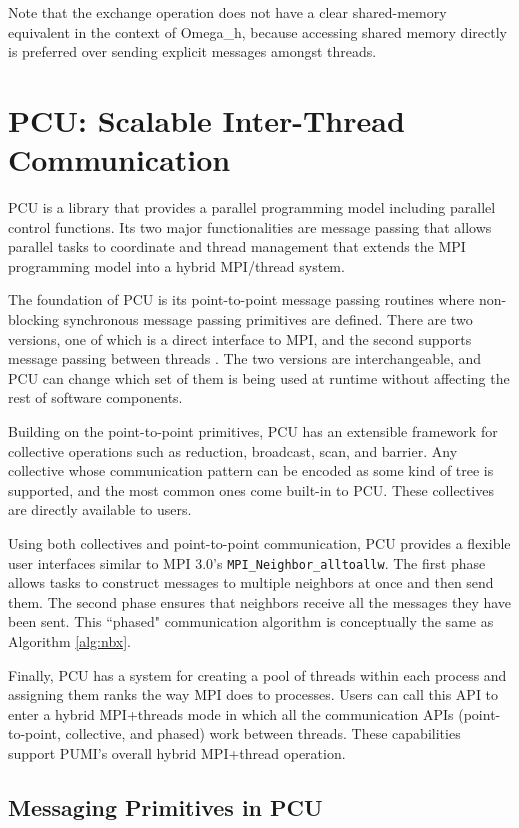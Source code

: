 Note that the exchange operation does not have a clear shared-memory equivalent
in the context of Omega\_h,
because accessing shared memory directly is preferred over sending
explicit messages amongst threads.

\section{PCU: Scalable Inter-Thread Communication}
\label{sec:pcu}

PCU is a library that provides a parallel programming model including
parallel control functions.
Its two major functionalities are message passing that allows parallel tasks to
coordinate and thread management that extends the MPI programming model
into a hybrid MPI/thread system.

The foundation of PCU is its point-to-point message passing routines where
non-blocking synchronous message passing primitives are defined. There are
two versions, one of which is a direct interface to MPI, and the second supports
message passing between threads \cite{ibanez2016hybrid}. The two versions
are interchangeable, and PCU can change which set of them is being used at
runtime without affecting the rest of software components.

Building on the point-to-point primitives, PCU has an extensible framework for
collective operations such as reduction, broadcast, scan, and barrier.
Any collective whose communication pattern can be encoded as some kind of tree
is supported, and the most common ones come built-in to PCU.
These collectives are directly available to users.

Using both collectives and point-to-point communication, PCU provides a flexible
user interfaces similar to MPI 3.0's \texttt{MPI\_Neighbor\_alltoallw}.
The first phase
allows tasks to construct messages to multiple neighbors
at once and then send them.
The second phase ensures that neighbors
receive all the messages they have been sent.
This ``phased" communication algorithm is
conceptually the same as Algorithm \ref{alg:nbx}.

Finally, PCU has a system for creating a pool of threads within each process and
assigning them ranks the way MPI does to processes.
Users can call this API to enter a hybrid MPI+threads mode in which all the
communication APIs (point-to-point, collective, and phased) work between
threads.
These capabilities support PUMI's overall hybrid MPI+thread operation.

\subsection{Messaging Primitives in PCU}
\label{sec:pcu_p2p}

